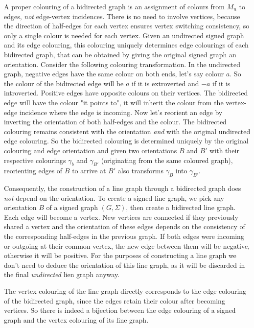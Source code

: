 A proper colouring of a bidirected graph is an assignment of colours from $M_n$ to edges, \textit{not} edge-vertex incidences.
There is no need to involve vertices, because the direction of half-edges for each vertex ensures vertex switching consistency, so only a single colour is needed for each vertex.
Given an undirected signed graph and its edge colouring, this colouring uniquely determines edge colourings of each bidirected graph, that can be obtained by giving the original signed graph an orientation.
Consider the following colouring transformation. In the undirected graph, negative edges have the same colour on both ends, let's say colour $a$. So the colour of the bidirected edge will be $a$ if it is extroverted and $-a$ if it is introverted.
Positive edges have opposite colours on their vertices. The bidirected edge will have the colour "it points to", it will inherit the colour from the vertex-edge incidence where the edge is incoming.
Now let's reorient an edge by inverting the orientation of both half-edges and the colour. The bidirected colouring remains consistent with the orientation \textit{and} with the original undirected edge colouring.
So the bidirected colouring is determined uniquely by the original colouring and edge orientation and given two orientations $B$ and $B'$ with their respective colourings $\gamma _b$ and $\gamma _{B'}$ (originating from the same coloured graph),
reorienting edges of $B$ to arrive at $B'$ also transforms $\gamma _B$ into $\gamma _{B'}$.

Consequently, the construction of a line graph through a bidirected graph does \textit{not} depend on the orientation. To create a signed line graph,
we pick any orientation $B$ of a signed graph $(G, \Sigma)$, then create a bidirected line graph. Each edge will become a vertex.
New vertices are connected if they previously shared a vertex and the orientation of these edges depends on the consistency of the corresponding half-edges in the previous graph.
If both edges were incoming or outgoing at their common vertex, the new edge between them will be negative, otherwise it will be positive.
For the purposes of constructing a line graph we don't need to deduce the orientation of this line graph, as it will be discarded in the final \textit{undirected} lien graph anyway.

The vertex colouring of the line graph directly corresponds to the edge colouring of the bidirected graph, since the edges retain their colour after becoming vertices.
So there is indeed a bijection between the edge colouring of a signed graph and the vertex colouring of its line graph.
